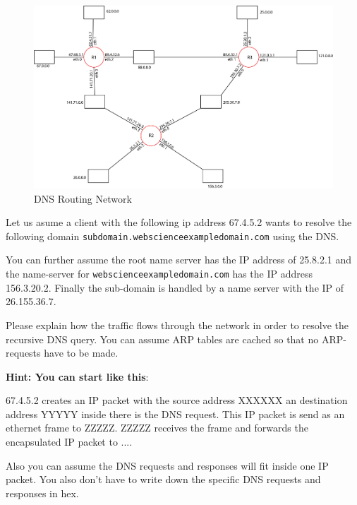 \documentclass{WeSTassignment}
\begin{document}
\begin{figure}[h]
  \centering
  \includegraphics[scale=0.45]{ass3_DNS.png}
   \caption{DNS Routing Network}
     \label{fig:routing} 
\end{figure}

Let us asume a client with the following ip address 67.4.5.2 wants to resolve the following domain  \texttt{subdomain.webscienceexampledomain.com} using the DNS.

You can further assume the root name server has the IP address of 25.8.2.1 and the name-server for \texttt{webscienceexampledomain.com} has the IP address 156.3.20.2. 
Finally the sub-domain is handled by a name server with the IP of 26.155.36.7. 

Please explain how the traffic flows through the network in order to resolve the recursive DNS query. You can assume ARP tables are cached so that no ARP-requests have to be made. 

\textbf{Hint: You can start like this}: 

67.4.5.2 creates an IP packet with the source address XXXXXX an destination address YYYYY inside there is the DNS request. This IP packet is send as an ethernet frame to ZZZZZ. 
ZZZZZ receives the frame and forwards the encapsulated IP packet to ....

Also you can assume the DNS requests and responses will fit inside one IP packet. You also don't have to write down the specific DNS requests and responses in hex. 






\makefooter
\end{document}
